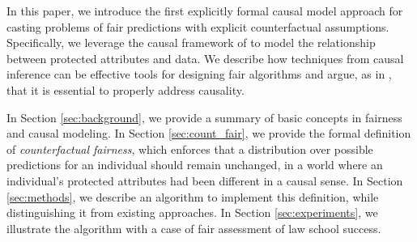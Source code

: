 % 


In this paper, we introduce the first explicitly formal causal model
approach for casting problems of fair predictions with explicit
counterfactual assumptions. Specifically, we leverage the causal framework of
\citet{pearl2009causal} to model the relationship between protected
attributes and data. We describe how techniques from causal
inference can be effective tools for designing fair algorithms and
argue, as in \citet{dedeo2014wrong}, that it is essential to properly
address causality.

In Section \ref{sec:background}, we provide a summary of basic
concepts in fairness and causal modeling. In Section
\ref{sec:count_fair}, we provide the formal definition of
\emph{counterfactual fairness}, which enforces that a distribution
over possible predictions for an individual should remain unchanged,
in a world where an individual's protected attributes had been
different in a causal sense. In Section \ref{sec:methods}, we describe an
algorithm to implement this definition, while distinguishing it from
existing approaches.  In Section \ref{sec:experiments}, we illustrate
the algorithm with a case of fair assessment of law school success.


